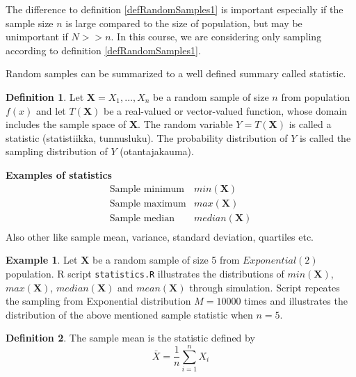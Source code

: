 \documentclass[10pt, twoside, a4paper]{book}
\theoremstyle{definition}
\newtheorem{example}{Example}[chapter]
\newtheorem{definition}{Definition}[chapter]
\begin{document}
The difference to definition \ref{defRandomSamples1} is important especially if
the sample size $n$ is large compared to the size of population, but may be
unimportant if $N >> n$. In this course, we are considering only sampling
according to definition \ref{defRandomSamples1}.

Random samples can be summarized to a well defined summary called statistic.

\begin{definition}
Let $\bm X = X_1,\ldots,X_n$ be a random sample of size $n$ from population
$f(x)$ and let $T(\bm X)$ be a real-valued or vector-valued function, whose
domain includes the sample space of $\bm X$. The random variable $Y = T(\bm X)$
is called a statistic (statistiikka, tunnusluku). The probability distribution
of $Y$ is called the sampling distribution of $Y$ (otantajakauma).
\end{definition}

\textbf{Examples of statistics}
\begin{equation*}
\renewcommand{\arraystretch}{1.6}
\begin{array}{ll}
\text{Sample minimum} & min(\bm X) \\
\text{Sample maximum} & max(\bm X) \\
\text{Sample median} & median(\bm X) \\
\end{array}
\end{equation*}
Also other like sample mean, variance, standard deviation, quartiles etc.

\begin{example} Let $\bm X$ be a random sample of size 5 from $Exponential(2)$
population. R script \verb#statistics.R# illustrates the distributions of
$min(\bm X)$, $max(\bm X)$, $median(\bm X)$ and $mean(\bm X)$ through
simulation. Script repeates the sampling from Exponential distribution $M=10000$
times and illustrates the distribution of the above mentioned sample statistic
when $n=5$.
\end{example}

\begin{definition}
The sample mean is the statistic defined by
$$\bar X = \frac{1}{n}\sum_{i=1}^n X_i$$
\end{definition}
\end{document}
